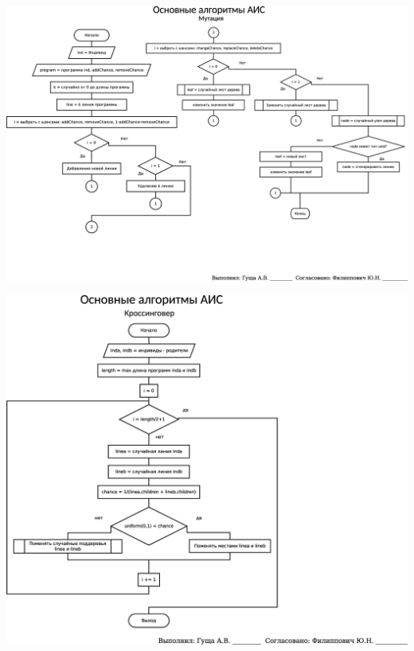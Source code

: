 \documentclass[russian,utf8, a1paper, emptystyle]{eskdgraph}
\begin{document}
\begin{ESKDdrawing}
\includegraphics[scale=0.99]{list4_1}
\end{ESKDdrawing}

\begin{ESKDdrawing}
\includegraphics[scale=0.99]{list4_2}
\end{ESKDdrawing}
\end{document}
